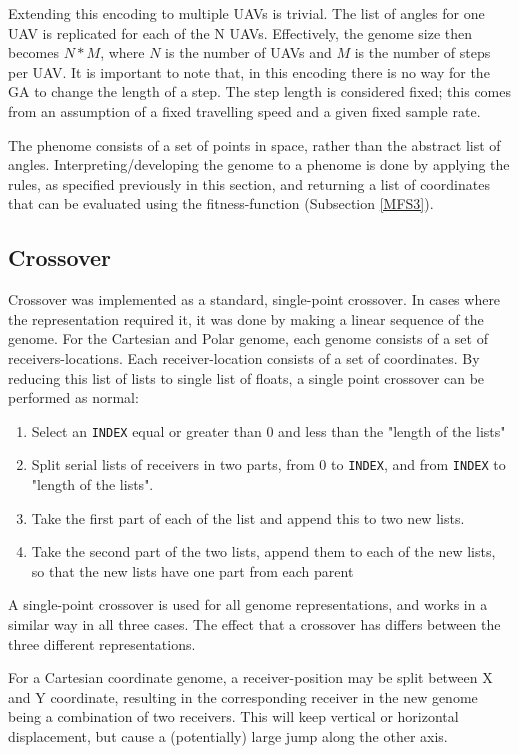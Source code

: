 \documentclass[10pt,a4paper]{book}
\begin{document}
Extending this encoding to multiple \glspl{UAV} is trivial. The list of angles for one \gls{UAV} is replicated for each of the N \glspl{UAV}. Effectively, the genome size then becomes $N*M$, where $N$ is the number of \glspl{UAV} and $M$ is the number of steps per \gls{UAV}. It is important to note that, in this encoding there is no way for the \gls{GA} to change the length of a step. The step length is considered fixed; this comes from an assumption of a fixed travelling speed and a given fixed sample rate. 

The phenome consists of a set of points in space, rather than the abstract list of angles. Interpreting/developing the genome to a phenome is done by applying the rules, as specified previously in this section, and returning a list of coordinates that can be evaluated using the fitness-function (Subsection \ref{MFS3}). 

\subsection{Crossover}
\label{EACROSSOVER}
Crossover was implemented as a standard, single-point crossover. In cases where the representation required it, it was done by making a linear sequence of the genome. For the Cartesian and Polar genome, each genome consists of a set of receivers-locations. Each receiver-location consists of a set of coordinates. By reducing this list of lists to single list of floats, a single point crossover can be performed as normal:

\begin{enumerate}
\item Select an \texttt{INDEX} equal or greater than 0 and less than the "length of the lists"
\item Split serial lists of receivers in two parts, from 0 to \texttt{INDEX}, and from \texttt{INDEX} to "length of the lists".
\item Take the first part of each of the list and append this to two new lists.
\item Take the second part of the two lists, append them to each of the new lists, so that the new lists have one part from each parent
\end{enumerate}

A single-point crossover is used for all genome representations, and works in a similar way in all three cases. The effect that a crossover has differs between the three different representations.

For a Cartesian coordinate genome, a receiver-position may be split between X and Y coordinate, resulting in the corresponding receiver in the new genome being a combination of two receivers. This will keep vertical or horizontal displacement, but cause a (potentially) large jump along the other axis. 
\end{document}
